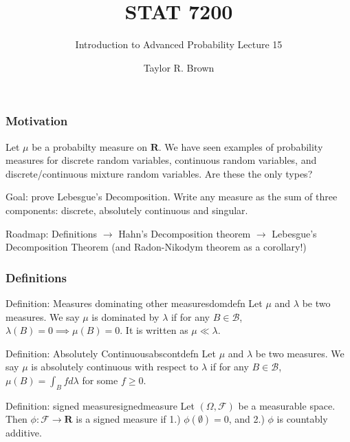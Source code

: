 \documentclass[handout]{beamer}
\title{STAT 7200}
\subtitle{Introduction to Advanced Probability \newline Lecture 15}
\author{Taylor R. Brown}
\institute{}
\date{}
\begin{document}
\frame{\titlepage}

\section[Outline]{}


\section[Beginnings]{}
\frame
{
\frametitle{Motivation} 

Let $\mu$ be a probabilty measure on $\mathbf{R}$. We have seen examples of probability measures for discrete random variables, continuous random variables, and discrete/continuous mixture random variables. Are these the only types?
\newline

Goal: prove Lebesgue's Decomposition. Write any measure as the sum of three components: discrete, absolutely continuous and singular.
\newline


Roadmap: Definitions $\to$ Hahn's Decomposition theorem $\to$ Lebesgue's Decomposition Theorem (and Radon-Nikodym theorem as a corollary!)
\newline





}



\frame
{
\frametitle{Definitions} 


\begin{mytheo}{Definition: Measures dominating other measures}{domdefn}
Let $\mu$ and $\lambda$ be two measures. We say $\mu$ is dominated by $\lambda$ if for any $B \in \mathcal{B}$, $\lambda(B)=0 \implies \mu(B)=0.$ It is written as $\mu \ll \lambda$.
\end{mytheo}

\begin{mytheo}{Definition: Absolutely Continuous}{abscontdefn}
Let $\mu$ and $\lambda$ be two measures. We say $\mu$ is absolutely continuous with respect to $\lambda$ if for any $B \in \mathcal{B}$, $\mu(B) = \int_B f d\lambda$ for some $f \ge 0$.
\end{mytheo}


\begin{mytheo}{Definition: signed measure}{signedmeasure}
Let $(\Omega, \mathcal{F})$ be a measurable space. Then $\phi : \mathcal{F} \to \mathbf{R}$ is a signed measure if 1.) $\phi(\emptyset) = 0$, and 2.) $\phi$ is countably additive.
\end{mytheo}



%   
%                                            

}
\end{document}
